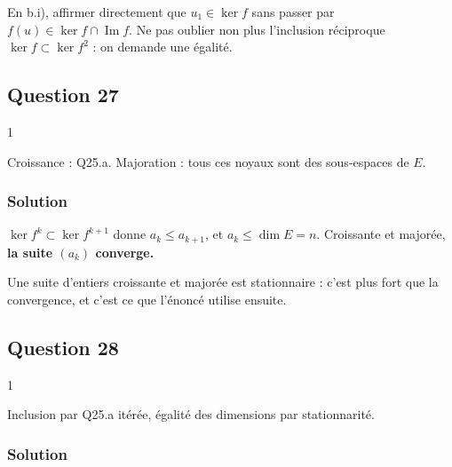 \documentclass[11pt,a4paper]{article}
\begin{document}
\begin{piege}

En b.i), affirmer directement que \(u_1\in\ker f\) sans passer par \(f(u)\in\ker f\cap\operatorname{Im}f\). Ne pas oublier non plus l'inclusion réciproque \(\ker f\subset\ker f^2\) : on demande une égalité.

\end{piege}

\hypertarget{question-27}{%
\subsection{Question 27}\label{question-27}}

\begin{indication}{1}

Croissance : Q25.a. Majoration : tous ces noyaux sont des sous-espaces de \(E\).

\end{indication}

\hypertarget{solution-26}{%
\subsubsection{Solution}\label{solution-26}}

\(\ker f^k\subset\ker f^{k+1}\) donne \(a_k\le a_{k+1}\), et \(a_k\le\dim E=n\). Croissante et majorée, \textbf{la suite \((a_k)\) converge.}

\begin{methode}

Une suite d'entiers croissante et majorée est stationnaire : c'est plus fort que la convergence, et c'est ce que l'énoncé utilise ensuite.

\end{methode}

\hypertarget{question-28}{%
\subsection{Question 28}\label{question-28}}

\begin{indication}{1}

Inclusion par Q25.a itérée, égalité des dimensions par stationnarité.

\end{indication}

\hypertarget{solution-27}{%
\subsubsection{Solution}\label{solution-27}}
\end{document}
